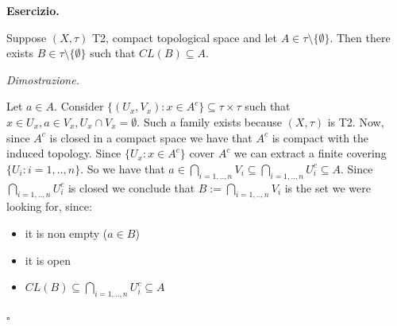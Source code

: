 \documentclass[a4paper,12pt]{article}
\newenvironment{exercise}
  {\par\vspace{1em}\noindent\textbf{Esercizio.} }
  {\par\vspace{1em}}
\newenvironment{proof}
  {\par\vspace{0.5em}\noindent\textit{Dimostrazione.} }
  {\par\vspace{1em}\hfill$\square$}
\begin{document}
\begin{exercise}
	
	Suppose $(X,\tau)$ T2, compact topological space and let $A \in \tau \setminus \{\emptyset\}$. Then there exists $B \in \tau \setminus \{\emptyset\}$ such that $CL(B) \subseteq A$.

\end{exercise}

\begin{proof}

	Let $a \in A$. Consider $\{(U_x,V_x) : x \in A^c \} \subseteq \tau \times \tau$ such that $x \in U_x, a \in V_x, U_x \cap V_x = \emptyset$.
	Such a family exists because $(X,\tau)$ is T2. Now, since $A^c$ is closed in a compact space we have that $A^c$ is compact with the induced topology.
	Since $\{U_x : x \in A^c\}$ cover $A^c$ we can extract a finite covering $\{U_i : i = 1,..,n\}$.
	So we have that $a \in \bigcap_{i=1,..,n} V_i \subseteq \bigcap_{i = 1,..,n} U_i^c \subseteq A$.
	Since $\bigcap_{i=1,..,n} U_i^c$ is closed we conclude that $B:=\bigcap_{i=1,..,n} V_i$ is the set we were looking for, since:
	\begin{itemize}
		\item	it is non empty ($a \in B$)
		\item	it is open
		\item	$CL(B) \subseteq \bigcap_{i=1,..,n} U_i^c \subseteq A$
	\end{itemize}

\end{proof} 
\end{document}
